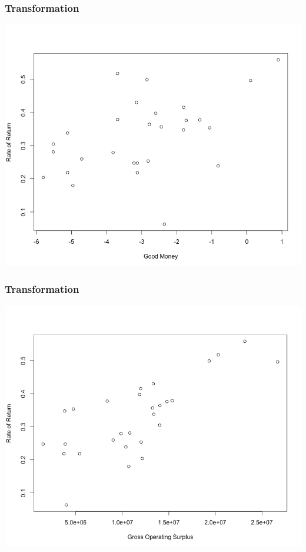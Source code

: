 \documentclass[12pt]{beamer}
\begin{document}
\begin{frame}
\frametitle{Transformation}
\begin{center}
\includegraphics[scale=0.3]{pic11.png}
\end{center}
\end{frame}
\begin{frame}
\frametitle{Transformation}
\begin{center}
\includegraphics[scale=0.3]{pic12.png}
\end{center}
\end{frame}
\end{document}
